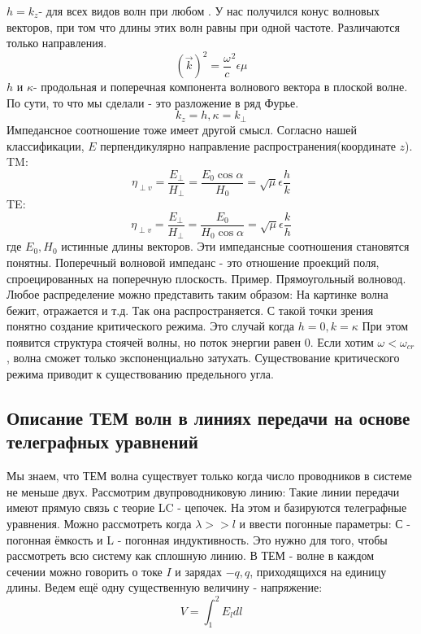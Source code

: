 $h = k_{z}$- для всех видов волн при любом . У нас получился конус волновых векторов, при том что длины этих волн равны при одной частоте. Различаются только направления.
\begin{equation}
	(\vec{k})^2 ={\frac{\omega}{c}}^2 \epsilon \mu
\end{equation}
%
$h$ и $\kappa$- продольная и поперечная компонента волнового вектора в плоской волне.
%
По сути, то что мы сделали - это разложение в ряд Фурье.
\begin{equation}
	k_z = h, \kappa = k_{\perp}
\end{equation}
Импедансное соотношение тоже имеет другой смысл.
%
Согласно нашей классификации, $E$ перпендикулярно направление распространения(координате $z$).
TM:
\begin{equation}
	\eta_{\perp v} = \frac{E_{\perp}}{H_{\perp}} = \frac{E_{0} \cos{\alpha}}{H_{0}} = \sqrt{\mu}{\epsilon} \frac{h}{k}
\end{equation}
TE:
\begin{equation}
	\eta_{\perp v} = \frac{E_{\perp}}{H_{\perp}} = \frac{E_{0}}{H_{0} \cos{\alpha}} = \sqrt{\mu}{\epsilon} \frac{k}{h}
\end{equation}
где $E_{0}, H_{0}$ истинные длины векторов. 
%
Эти импедансные соотношения становятся понятны. Поперечный волновой импеданс - это отношение проекций поля, спроецированных на поперечную плоскость.
%
Пример. Прямоугольный волновод.
Любое распределение можно представить таким образом:
На картинке волна бежит, отражается и т.д. Так она распространяется.
%
С такой точки зрения понятно создание критического режима.
%
Это случай когда $h = 0, k = \kappa$
%
При этом появится структура стоячей волны, но поток энергии равен 0. 
%
Если хотим $\omega < \omega_{cr}$, волна сможет только экспоненциально затухать. 
%
Существование критического режима приводит к существованию предельного угла.
\subsection{Описание ТЕМ волн в линиях передачи на основе телеграфных уравнений}
Мы знаем, что ТЕМ волна существует только когда число проводников в системе не меньше двух.
%
Рассмотрим двупроводниковую линию:
%
Такие линии передачи имеют прямую связь с теорие LC - цепочек.
%
На этом и базируются телеграфные уравнения.
Можно рассмотреть когда $\lambda >> l$ и ввести погонные параметры: С - погонная ёмкость и L - погонная индуктивность. Это нужно для того, чтобы рассмотреть всю систему как сплошную линию. 
%
В ТЕМ - волне в каждом сечении можно говорить о токе $I$ и зарядах $-q, q$, приходящихся на единицу длины. Ведем ещё одну существенную величину - напряжение:
\begin{equation}
	V = \int_1^2 E_l dl
\end{equation}

